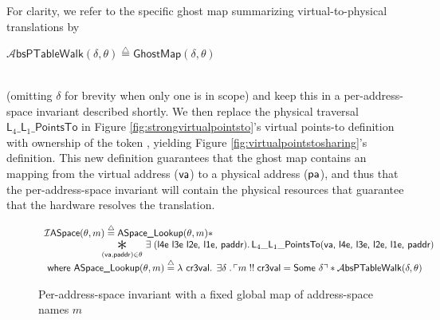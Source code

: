 For clarity, we refer to the specific ghost map summarizing virtual-to-physical translations by \\
\centerline{$\mathcal{A}\textsf{bsPTableWalk}(\delta,\theta) \stackrel{\triangle}{=} \mathsf{GhostMap}(\delta,\theta)$}\\
(omitting $\delta$ for brevity when only one is in scope)
and keep this in a per-address-space invariant described shortly.
We then replace the physical traversal $\textsf{L}_{4}\_\textsf{L}_{1}\_\textsf{PointsTo}$ in Figure \ref{fig:strongvirtualpointsto}'s virtual points-to definition
with ownership of the token \ghostmaptoken{\delta}{\vaddr}{\paddr}, %
yielding Figure \ref{fig:virtualpointstosharing}'s definition.
This new definition guarantees that the ghost map contains an mapping from the virtual address ($\mathsf{va}$) to a physical address ($\textsf{pa}$),
and thus that the per-address-space invariant will contain the physical resources that guarantee that the hardware resolves the translation.

  \begin{figure*}
  \footnotesize
\centerline{$
\begin{array}{l}
  \mathcal{I}\textsf{ASpace}(\ptablestore,m)\stackrel{\triangle}{=} \textsf{ASpace\_Lookup}(\ptablestore,m) \ast \\
 \qquad\qquad\qquad \bigast{(\vaddr, \textsf{paddr})\in \ptablestore}{\exists\;(\textsf{l4e l3e l2e, l1e, paddr})\ldotp \textsf{L}_{4}\_\textsf{L}_{1}\_\textsf{PointsTo}(\vaddr\textsf{, l4e, l3e, l2e, l1e, paddr})} \\
  \textsf{ where } 
   \textsf{ASpace\_Lookup} (\ptablestore,m) \stackrel{\triangle}{=} \lambda\textsf{ cr3val} \ldotp \; \exists \gammaPred \; \ldotp \ulcorner m \; !!\; \textsf{cr3val} = \textsf{Some } \gammaPred \urcorner \ast
    \ptableabswalk{\delta,\theta}
\end{array}
$}
\vspace{-1em}
\caption{Per-address-space invariant with a fixed global map of address-space names $m$}
  \label{fig:peraspaceinvariant}
\vspace{-1em}
  \end{figure*}

